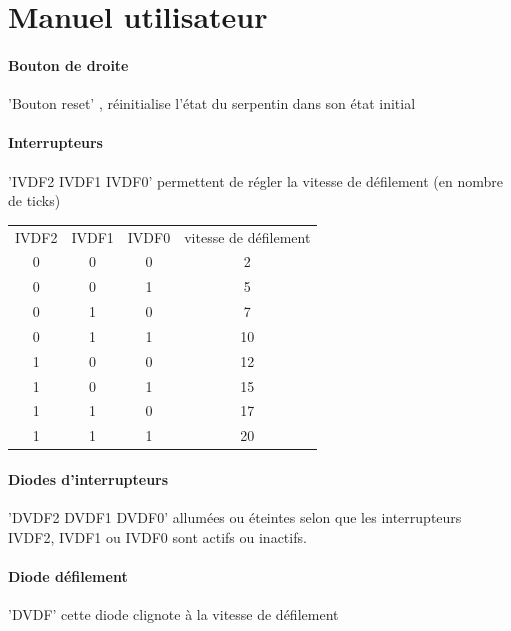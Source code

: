 \documentclass[10pt]{article}
\begin{document}
    \newpage
    \section{Manuel utilisateur}
    
    \paragraph{Bouton de droite} 'Bouton reset' , réinitialise l'état du serpentin dans son état initial
    
    \paragraph{Interrupteurs} 'IVDF2 IVDF1 IVDF0' permettent de régler la vitesse de défilement (en nombre de ticks)
    
    \begin{table}[h]
        \centering
        \begin{tabular}{cccc}
                IVDF2 & IVDF1 & IVDF0 & vitesse de défilement \\
                  0   &   0   &   0   & 2 \\
                  0   &   0   &   1   & 5 \\
                  0   &   1   &   0   & 7 \\
                  0   &   1   &   1   & 10 \\
                  1   &   0   &   0   & 12 \\
                  1   &   0   &   1   & 15 \\
                  1   &   1   &   0   & 17 \\
                  1   &   1   &   1   & 20 \\
        \end{tabular}
    \end{table}
        
    \paragraph{Diodes d'interrupteurs} 'DVDF2 DVDF1 DVDF0' allumées ou éteintes selon que les interrupteurs IVDF2, IVDF1 ou IVDF0 sont actifs ou inactifs.
    
    \paragraph{Diode défilement} 'DVDF' cette diode clignote à la vitesse de défilement
    
\end{document}
